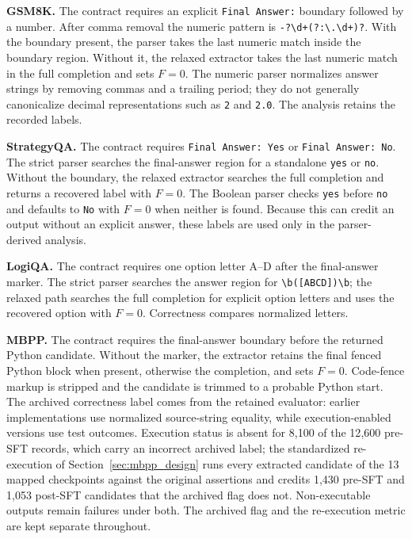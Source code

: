 \documentclass{article}
\begin{document}
\noindent\textbf{GSM8K.}
The contract requires an explicit \texttt{Final Answer:} boundary followed by a
number. After comma removal the numeric pattern is
\verb|-?\d+(?:\.\d+)?|. With the boundary present, the parser takes the last
numeric match inside the boundary region. Without it, the relaxed extractor
takes the last numeric match in the full completion and sets $F=0$.
The numeric parser normalizes answer strings by removing commas and a
trailing period; they do not generally canonicalize decimal representations
such as \texttt{2} and \texttt{2.0}. The analysis retains the recorded labels.

\noindent\textbf{StrategyQA.}
The contract requires \texttt{Final Answer: Yes} or \texttt{Final Answer: No}.
The strict parser searches the final-answer region for a standalone
\texttt{yes} or \texttt{no}. Without the boundary, the relaxed extractor
searches the full completion and returns a recovered label with $F=0$.
The Boolean parser checks \texttt{yes} before \texttt{no} and defaults to
\texttt{No} with $F=0$ when neither is found. Because this can credit an
output without an explicit answer, these labels are used only in the
parser-derived analysis.

\noindent\textbf{LogiQA.}
The contract requires one option letter A--D after the final-answer marker.
The strict parser searches the answer region for \verb|\b([ABCD])\b|; the
relaxed path searches the full completion for explicit option letters and uses
the recovered option with $F=0$. Correctness compares normalized letters.

\noindent\textbf{MBPP.}
The contract requires the final-answer boundary before the returned Python
candidate. Without the marker, the extractor retains the final fenced Python
block when present, otherwise the completion, and sets $F=0$. Code-fence
markup is stripped and the candidate is trimmed to a probable Python start.
The archived correctness label comes from the retained evaluator: earlier
implementations use normalized source-string equality, while execution-enabled
versions use test outcomes. Execution status is absent for 8{,}100 of the
12{,}600 pre-SFT records, which carry an incorrect archived label;
the standardized re-execution of Section~\ref{sec:mbpp_design} runs every
extracted candidate of the 13 mapped checkpoints against the original
assertions and credits 1{,}430 pre-SFT and 1{,}053 post-SFT candidates that
the archived flag does not. Non-executable outputs remain failures under
both. The archived flag and the re-execution metric are kept separate
throughout.
\end{document}
